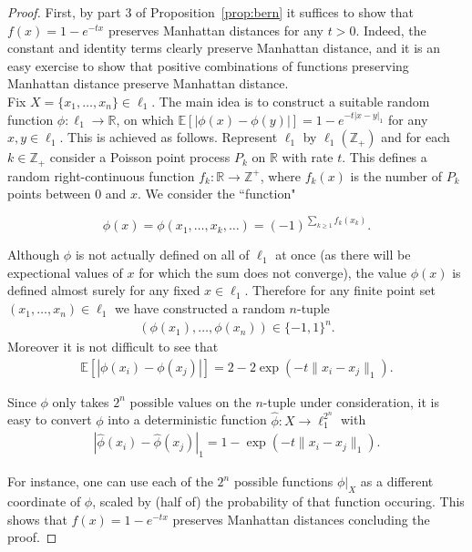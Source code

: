 \begin{proof}

First, by part 3 of Proposition~\ref{prop:bern} it suffices to show that $f(x)=1-e^{-tx}$ preserves Manhattan distances for any $t>0$. Indeed, the constant and identity terms clearly preserve Manhattan distance, and it is an easy exercise to show that positive combinations of functions preserving Manhattan distance preserve Manhattan distance.\\

Fix $X=\{x_1,\dots,x_n\}\in \ell_1$. The main idea is to construct a suitable random function $\phi:\ell_1\to \mathbb R$, on which $\mathbb E[|\phi(x)-\phi(y)|]=1-e^{-t|x-y|_1}$ for any $x,y\in \ell_1$. This is achieved as follows. Represent $\ell_1$ by $\ell_1(\mathbb Z_+)$ and for each $k\in \mathbb Z_+$ consider a Poisson point process $P_k$ on $\mathbb R$ with rate $t$. This defines a random right-continuous function $f_k:\mathbb R\to \mathbb Z^+$, where $f_k(x)$ is the number of $P_k$ points between $0$ and $x$. We consider the ``function"

\[\phi(x)=\phi(x_1,\dots,x_k,\dots)=(-1)^{\sum_{k\geq 1} f_k(x_k)}.\]

Although $\phi$ is not actually defined on all of $\ell_1$ at once (as there will be expectional values of $x$ for which the sum does not converge), the value $\phi(x)$ is defined almost surely for any fixed $x\in\ell_1$. Therefore for any finite point set $(x_1,\dots,x_n)\in\ell_1$ we have constructed a random $n$-tuple
\begin{align*}
(\phi(x_1),\dots,\phi(x_n))\in \{-1,1\}^n.
\end{align*}
Moreover it is not difficult to see that 
\begin{align*}
\mathbb{E} [ |\phi(x_i)-\phi(x_j)| ]=2-2\exp(-t\|x_i-x_j\|_1).
\end{align*}

Since $\phi$ only takes $2^n$ possible values on the $n$-tuple under consideration, it is easy to convert $\phi$ into a deterministic function $\hat\phi:X\to\ell_1^{2^n}$ with 
\begin{align*}
|\hat\phi(x_i)-\hat\phi(x_j)|_1=1- \exp(-t \| x_i - x_j \|_1 ).
\end{align*}

For instance, one can use each of the $2^n$ possible functions $\phi|_{X}$ as a different coordinate of $\hat\phi$, scaled by (half of) the probability of that function occuring. This shows that $f(x)=1-e^{-tx}$ preserves Manhattan distances concluding the proof.

\end{proof}



